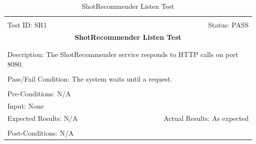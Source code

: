 \documentclass[11pt]{article}
\begin{document}
\begin{center}
\begin{table}[H]
\begin{tabular}{|l r|}\hline&\\[-2mm]
	Test ID: SR1	&Status: PASS\\[-3mm]
	\multicolumn{2}{|c|}{\textbf{\large{ShotRecommender Listen Test}}}\\&\\\hline&\\[-3mm]
	\multicolumn{2}{|p{\textwidth}|}{Description: The ShotRecommender service responds to HTTP calls on port 8080.}\\[1mm]\hline&\\[-3mm]
	\multicolumn{2}{|p{\textwidth}|}{Pass/Fail Condition: The system waits until a request.}\\[1mm]\hline&\\[-3mm]
	\multicolumn{2}{|p{\textwidth}|}{Pre-Conditions: N/A}\\[4mm]
	\multicolumn{2}{|p{\textwidth}|}{Input: None}\\[2mm]\hline
	\multicolumn{1}{|p{0.49\textwidth}}{Expected Results: N/A}	&\multicolumn{1}{|p{0.45\textwidth}|}{Actual Results: As expected}\\\hline&\\[-3mm]
	\multicolumn{2}{|p{\textwidth}|}{Post-Conditions: N/A}\\\hline
\end{tabular}
\caption{ShotRecommender Listen Test}
\end{table}
\end{center}
\end{document}
